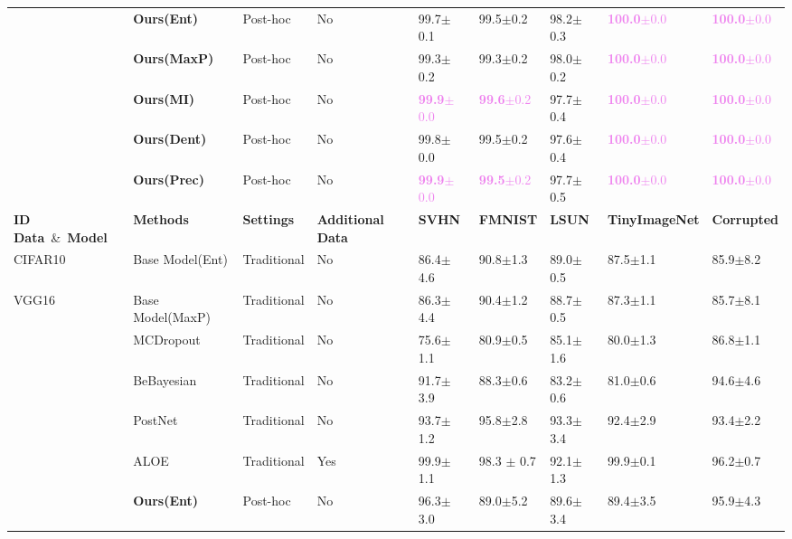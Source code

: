 \begin{table}[t]
\begin{center}
\begin{tabular}{lllllllll}
    \hline
              & \textbf{Ours(Ent)} & Post-hoc & No & 99.7$\pm$0.1 & 99.5$\pm$0.2 & 98.2$\pm$0.3 &  \textcolor{violet}{\textbf{100.0}$\pm$0.0} & \textcolor{violet}{\textbf{100.0}$\pm$0.0} \\
              & \textbf{Ours(MaxP)} & Post-hoc & No & 99.3$\pm$0.2 & 99.3$\pm$0.2 & 98.0$\pm$0.2 &  \textcolor{violet}{\textbf{100.0}$\pm$0.0} & \textcolor{violet}{\textbf{100.0}$\pm$0.0} \\
              & \textbf{Ours(MI)} & Post-hoc & No & \textcolor{violet}{\textbf{99.9}$\pm$0.0} & \textcolor{violet}{\textbf{99.6}$\pm$0.2} &97.7$\pm$0.4 &  \textcolor{violet}{\textbf{100.0}$\pm$0.0} & \textcolor{violet}{\textbf{100.0}$\pm$0.0} \\
              & \textbf{Ours(Dent)} & Post-hoc & No & 99.8$\pm$0.0 & 99.5$\pm$0.2 & 97.6$\pm$0.4 & \textcolor{violet}{\textbf{100.0}$\pm$0.0} & \textcolor{violet}{\textbf{100.0}$\pm$0.0} \\
              & \textbf{Ours(Prec)} & Post-hoc & No & \textcolor{violet}{\textbf{99.9}$\pm$0.0} & \textcolor{violet}{\textbf{99.5}$\pm$0.2} &97.7$\pm$0.5 &  \textcolor{violet}{\textbf{100.0}$\pm$0.0} & \textcolor{violet}{\textbf{100.0}$\pm$0.0} \\
    \toprule
    \textbf{ID Data}\ \&\ \textbf{Model} & \textbf{Methods} & \textbf{Settings} & \textbf{Additional Data} & \textbf{SVHN}& \textbf{FMNIST} & \textbf{LSUN}& \textbf{TinyImageNet} &\textbf{Corrupted} \\
    \hline
    CIFAR10 & Base Model(Ent) & Traditional & No & 86.4$\pm$4.6 & 90.8$\pm$1.3 & 89.0$\pm$0.5 & 87.5$\pm$1.1 & 85.9$\pm$8.2  \\
    VGG16   & Base Model(MaxP) & Traditional & No & 86.3$\pm$4.4 & 90.4$\pm$1.2 & 88.7$\pm$0.5 & 87.3$\pm$1.1 & 85.7$\pm$8.1   \\
              & MCDropout & Traditional & No & 75.6$\pm$1.1 & 80.9$\pm$0.5 & 85.1$\pm$1.6 & 80.0$\pm$1.3 & 86.8$\pm$1.1   \\
              & BeBayesian &Traditional & No & 91.7$\pm$3.9 & 88.3$\pm$0.6 & 83.2$\pm$0.6 & 81.0$\pm$0.6 & 94.6$\pm$4.6   \\
              & PostNet & Traditional & No & 93.7$\pm$1.2 & 95.8$\pm$2.8 & 93.3$\pm$3.4 & 92.4$\pm$2.9 & 93.4$\pm$2.2  \\
              & ALOE & Traditional & Yes & 99.9$\pm$1.1 & 98.3 $\pm$ 0.7 & 92.1$\pm$1.3  & 99.9$\pm$0.1  & 96.2$\pm$0.7  \\
    \hline
              & \textbf{Ours(Ent)} & Post-hoc & No & 96.3$\pm$3.0 &89.0$\pm$5.2 & 89.6$\pm$3.4 &  89.4$\pm$3.5& 95.9$\pm$4.3 \\

\end{tabular}
\end{center}
\end{table}
